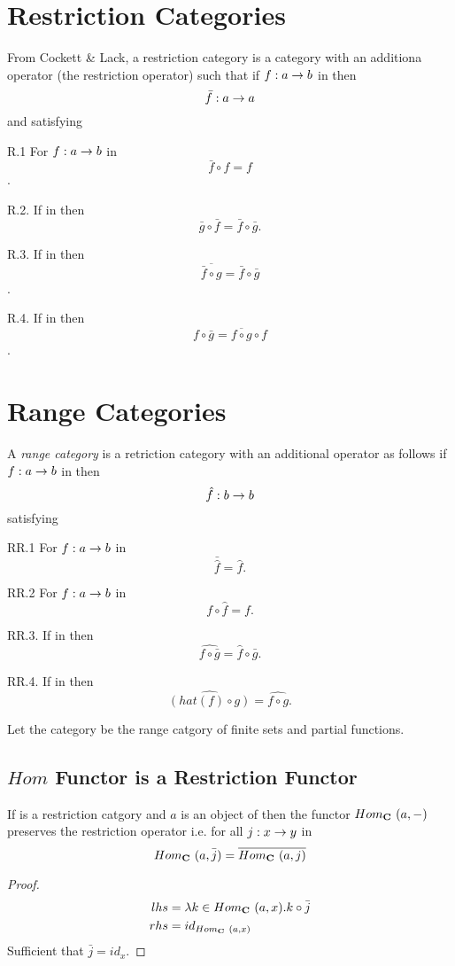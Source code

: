 \documentclass[10pt,a4paper]{article}
\theoremstyle{remark}
\renewcommand{\term}[1]{\textit{#1}}  %
\begin{document}
\section{Restriction Categories}

From Cockett \& Lack, a restriction category is a category \catcw with an additiona operator (the restriction operator) such that
if $f: a \rightarrow b$ in \catcw then
$$\bar{f}: a \rightarrow a$$ 
and satisfying

R.1 For $f:a \rightarrow b$ in \catcw $$\bar{f} \circ f =f$$.

R.2. If \fgsourcediag in \catcw then
$$\bar{g} \circ \bar{f}=\bar{f} \circ \bar{g}.$$

R.3. If \fgsourcediag in \catcw then
$$\overline{\bar{f} \circ g} = \bar{f} \circ \bar{g}$$.

R.4. If  in \catcw then
$$f \circ \bar{g} = \overline{f \circ g} \circ f$$.

\section{Range Categories}

A \term{range category} is a retriction category with an additional operator as follows
if $f: a \rightarrow b$ in  \catcw then
$$\hat{f}: b \rightarrow b$$
satisfying

RR.1 For $f:a \rightarrow b$ in \catcw $$\bar{\hat{f}} = \hat{f}.$$

RR.2 For $f:a \rightarrow b$ in \catcw $$f \circ \hat{f} = f.$$

RR.3. If  in \catcw then
$$\widehat{f \circ \bar{g}} = \hat{f} \circ \bar{g}.$$

RR.4. If  in \catcw then
$$\widehat{(hat({f}) \circ g)} = \widehat{f \circ g}.$$


Let the category \FinPar be the range catgory of finite sets and partial functions.


\subsection{$Hom$ Functor is a Restriction Functor}
 
\begin{lemma}
If \catcw is a restriction catgory and $a$ is an object of \catcw 
then the functor $Hom_{\textbf{C}}\ (a,-)$ preserves the restriction operator i.e.
for all $j:x \rightarrow y$ in \catc
$$Hom_{\textbf{C}}\ (a,\bar{j})=\overline{Hom_{\textbf{C}}\ (a,j)}$$
\end{lemma}
\begin{proof}
\begin{align*}
lhs &= \lambda k \in Hom_{\textbf{C}}\ (a,x).k \circ \bar{j}  \\
rhs &=  id_{Hom_{\textbf{C}}\ (a,x)}
\end{align*}
Sufficient that $\bar{j}=id_x$.
\end{proof}
\end{document}
